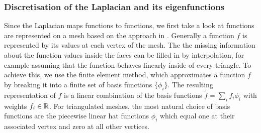 \subsubsection{Discretisation of the Laplacian and its eigenfunctions}
Since the Laplacian maps functions to functions, we first take a look at functions are represented on a mesh based on the approach in \cite{discretelaplacian2011}.
Generally a function $f$ is represented by its values at each vertex of the mesh.
The the missing information about the function values inside the faces can be filled in by interpolation, for example assuming that the function behaves linearly inside of every triangle.
To achieve this, we use the finite element method, which approximates a function $f$ by breaking it into a finite set of basis functions $\{\phi_i\}$.
The resulting representation of $f$ is a linear combination of the basis functions $\tilde{f} = \sum_i f_i \phi_i$ with weights $f_i \in \mathbb{R}$.
For triangulated meshes, the most natural choice of basis functions are the piecewise linear hat functions $\phi_i$ which equal one at their associated vertex and zero at all other vertices.

